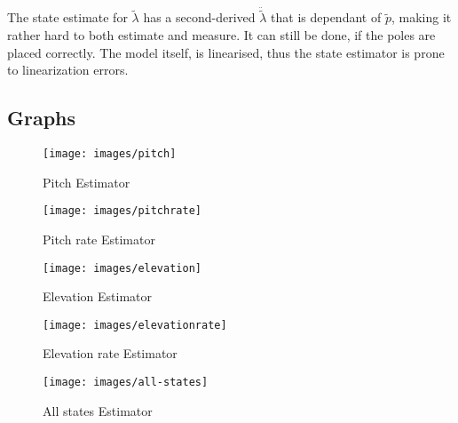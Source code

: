 The state estimate for $\tilde {\lambda}$ has a second-derived ${\ddot {\tilde {\lambda}}}$ that is dependant of ${\tilde p}$, making it rather hard to both estimate and measure. It can still be done, if the poles are placed correctly. The model itself, is linearised, thus the state estimator is prone to linearization errors. 



\newpage
\subsection{Graphs}


\begin{figure}[!htb]
    \centering
    \texttt{[image: images/pitch]}
    \caption{Pitch Estimator}
   
\end{figure}
\begin{figure}[!htb]
    \centering
    \texttt{[image: images/pitchrate]}
    \caption{Pitch rate Estimator}

\end{figure}
\begin{figure}[!htb]
    \centering
    \texttt{[image: images/elevation]}
    \caption{Elevation Estimator}

\end{figure}
\begin{figure}[!htb]
    \centering
    \texttt{[image: images/elevationrate]}
    \caption{Elevation rate Estimator}
\end{figure}


\begin{figure}
    \centering
    \texttt{[image: images/all-states]}
    \caption{All states Estimator}
\end{figure}

